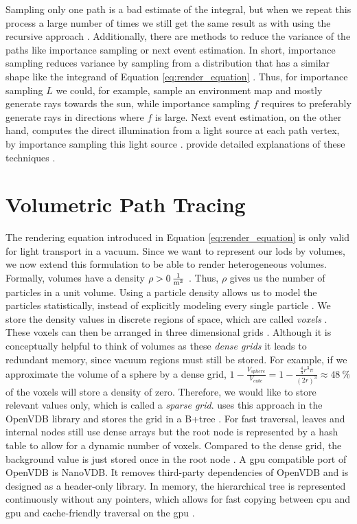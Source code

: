Sampling only one path is a bad estimate of the integral, but when we repeat this process a large number of times we still get the same result as with using the recursive approach \cite{pbr}.
Additionally, there are methods to reduce the variance of the paths like importance sampling or next event estimation.
In short, importance sampling reduces variance by sampling from a distribution that has a similar shape like the integrand of Equation \ref{eq:render_equation} \cite{rendering_equation}.
Thus, for importance sampling $L$ we could, for example, sample an environment map and mostly generate rays towards the sun, while importance sampling $f$ requires to preferably generate rays in directions where $f$ is large.
Next event estimation, on the other hand, computes the direct illumination from a light source at each path vertex, by importance sampling this light source \cite{pbr}.
\citeauthor{pbr} provide detailed explanations of these techniques \cite{pbr}.

\section{Volumetric Path Tracing}
The rendering equation introduced in Equation \ref{eq:render_equation} is only valid for light transport in a vacuum.
Since we want to represent our \acsp{lod} by volumes, we now extend this formulation to be able to render heterogeneous volumes.
Formally, volumes have a density ${\rho > \SI{0}{\frac{1}{\m^3}}}$ \cite{pbr}.
Thus, $\rho$ gives us the number of particles in a unit volume.
Using a particle density allows us to model the particles statistically, instead of explicitly modeling every single particle \cite{novak_overview}.
We store the density values in discrete regions of space, which are called \textit{voxels} \cite{pbr}.
These voxels can then be arranged in three dimensional grids \cite{pbr}.
Although it is conceptually helpful to think of volumes as these \textit{dense grids} it leads to redundant memory, since vacuum regions must still be stored.
For example, if we approximate the volume of a sphere by a dense grid, $1 - \frac{V_{sphere}}{V_{cube}} = 1 - \frac{\frac{4}{3}r^3\pi}{(2r)^3}\approx \SI{48}{\%}$ of the voxels will store a density of zero.
Therefore, we would like to store relevant values only, which is called a \textit{sparse grid}.
\citeauthor{museth_vdb} uses this approach in the OpenVDB library and stores the grid in a B+tree \cite{museth_vdb}.
For fast traversal, leaves and internal nodes still use dense arrays but the root node is represented by a hash table to allow for a dynamic number of voxels.
Compared to the dense grid, the background value is just stored once in the root node \cite{museth_vdb}.
A \ac{gpu} compatible port of OpenVDB is NanoVDB.
It removes third-party dependencies of OpenVDB and is designed as a header-only library.
In memory, the hierarchical tree is represented continuously without any pointers, which allows for fast copying between \ac{cpu} and \ac{gpu} and cache-friendly traversal on the \ac{gpu} \cite{museth_nanovdb}.

